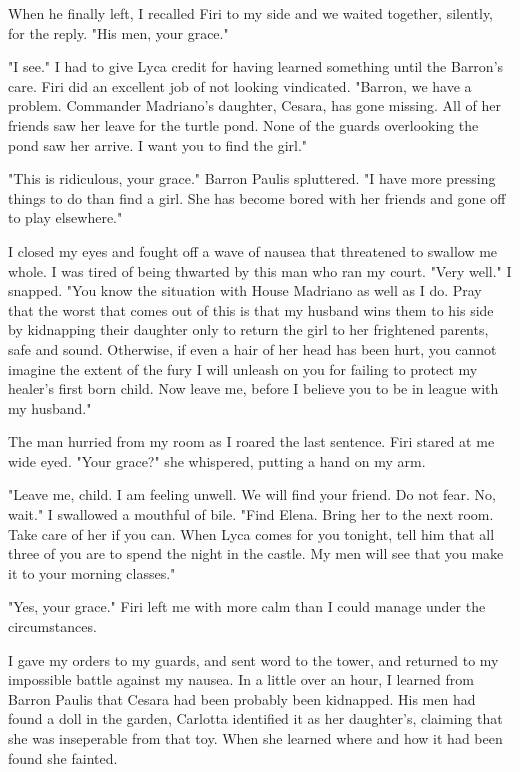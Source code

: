 \documentclass{article}
\begin{document}
When he finally left, I recalled Firi to my side and we waited together, silently, for the reply. "His men, your grace."

"I see." I had to give Lyca credit for having learned something until the Barron's care. Firi did an excellent job of not looking vindicated. "Barron, we have a problem. Commander Madriano's daughter, Cesara, has gone missing. All of her friends saw her leave for the turtle pond. None of the guards overlooking the pond saw her arrive. I want you to find the girl."

"This is ridiculous, your grace." Barron Paulis spluttered. "I have more pressing things to do than find a girl. She has become bored with her friends and gone off to play elsewhere."

I closed my eyes and fought off a wave of nausea that threatened to swallow me whole. I was tired of being thwarted by this man who ran my court. "Very well." I snapped. "You know the situation with House Madriano as well as I do. Pray that the worst that comes out of this is that my husband wins them to his side by kidnapping their daughter only to return the girl to her frightened parents, safe and sound. Otherwise, if even a hair of her head has been hurt, you cannot imagine the extent of the fury I will unleash on you for failing to protect my healer's first born child. Now leave me, before I believe you to be in league with my husband."

The man hurried from my room as I roared the last sentence. Firi stared at me wide eyed. "Your grace?" she whispered, putting a hand on my arm.

"Leave me, child. I am feeling unwell. We will find your friend. Do not fear. No, wait." I swallowed a mouthful of bile. "Find Elena. Bring her to the next room. Take care of her if you can. When Lyca comes for you tonight, tell him that all three of you are to spend the night in the castle. My men will see that you make it to your morning classes."

"Yes, your grace." Firi left me with more calm than I could manage under the circumstances. 

I gave my orders to my guards, and sent word to the tower, and returned to my impossible battle against my nausea. In a little over an hour, I learned from Barron Paulis that Cesara had been probably been kidnapped. His men had found a doll in the garden, Carlotta identified it as her daughter's, claiming that she was inseperable from that toy. When she learned where and how it had been found she fainted.
\end{document}
